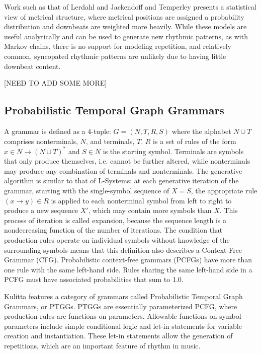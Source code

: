 \documentclass{article}
\begin{document}
Work such as that of Lerdahl and Jackendoff \cite{gttm} and Temperley \cite{temperley2010} presents a statistical view of metrical structure, where metrical positions are assigned a probability distribution and downbeats are weighted more heavily. While these models are useful analytically and can be used to generate new rhythmic patterns, as with Markov chains, there is no support for modeling repetition, and relatively common, syncopated rhythmic patterns are unlikely due to having little downbeat content. 

[NEED TO ADD SOME MORE]

\subsection{Probabilistic Temporal Graph Grammars}

A grammar is defined as a 4-tuple: $G= (N,T,R,S)$ where the alphabet $N\cup T$ comprises nonterminals, $N$, and terminals, $T$. $R$ is a set of rules of the form $x \in N \rightarrow (N \cup T)^{*}$ and $S \in N$ is the starting symbol. Terminals are symbols that only produce themselves, i.e. cannot be further altered, while nonterminals may produce any combination of terminals and nonterminals. The generative algorithm is similar to that of L-Systems: at each generative iteration of the grammar, starting with the single-symbol sequence of $X = S$, the appropriate rule $(x \rightarrow y) \in R$ is applied to each nonterminal symbol from left to right to produce a new sequence $X'$, which may contain more symbols than $X$. This process of iteration is called expansion, because the sequence length is a nondecreasing function of the number of iterations. The condition that production rules operate on individual symbols without knowledge of the surrounding symbols means that this definition also describes a Context-Free Grammar (CFG). Probabilistic context-free grammars (PCFGs) have more than one rule with the same left-hand side. Rules sharing the same left-hand side in a PCFG must have associated probabilities that sum to 1.0.

Kulitta features a category of grammars called Probabilistic Temporal Graph Grammars\cite{quick2013farm, quick_thesis}, or PTGGs. PTGGs are essentially parameterized PCFG, where production rules are functions on parameters. Allowable functions on symbol parameters include simple conditional logic and let-in statements for variable creation and instantiation. These let-in statements allow the generation of repetitions, which are an important feature of rhythm in music.
\end{document}
